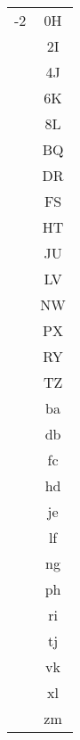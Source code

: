 \documentclass[11pt,a4paper]{scrarticle}
\theoremstyle{definition}
\begin{document}
\begin{longtable}{|c|c|}
    -2         & 0H              \\ & 2I \\ & 4J \\ & 6K \\ & 8L \\ & BQ \\ & DR \\ & FS \\ & HT \\ & JU \\ & LV \\ & NW \\ & PX \\ & RY \\ & TZ \\ & ba \\ & db \\ & fc \\ & hd \\ & je \\ & lf \\ & ng \\ & ph \\ & ri \\ & tj \\ & vk \\ & xl \\ & zm \\
    \hline

\end{longtable}
\end{document}

